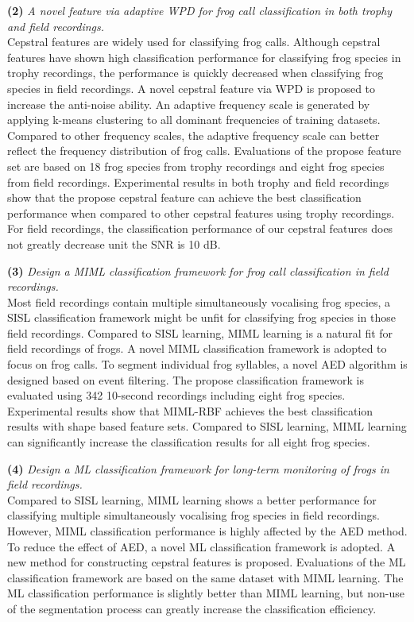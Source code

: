 \textbf{(2)} \textit{A novel feature via adaptive WPD for frog call classification in both trophy and field recordings.}
\\
Cepstral features are widely used for classifying frog calls. Although cepstral features have shown high classification performance for classifying frog species in trophy recordings, the performance is quickly decreased when classifying frog species in field recordings. A novel cepstral feature via WPD is proposed to increase the anti-noise ability. An adaptive frequency scale is generated by applying k-means clustering to all dominant frequencies of training datasets. Compared to other frequency scales, the adaptive frequency scale can better reflect the frequency distribution of frog calls. Evaluations of the propose feature set are based on 18 frog species from trophy recordings and eight frog species from field recordings. Experimental results in both trophy and field recordings show that the propose cepstral feature can achieve the best classification performance when compared to other cepstral features using trophy recordings. For field recordings, the classification performance of our cepstral features does not greatly decrease unit the SNR is 10 dB.



\textbf{(3)}  \textit{Design a MIML classification framework for frog call classification in field recordings.} 
\\
Most field recordings contain multiple simultaneously vocalising frog species, a SISL classification framework might be unfit for classifying frog species in those field recordings. Compared to SISL learning, MIML learning is a natural fit for field recordings of frogs. A novel MIML classification framework is adopted to focus on frog calls. To segment individual frog syllables, a novel AED algorithm is designed based on event filtering. The propose classification framework is evaluated using 342 10-second recordings including eight frog species. Experimental results show that MIML-RBF achieves the best classification results with shape based feature sets. Compared to SISL learning, MIML learning can significantly increase the classification results for all eight frog species.

\textbf{(4)}  \textit{Design a ML classification framework for long-term monitoring of frogs in field recordings.} 
\\ 
Compared to SISL learning, MIML learning shows a better performance for classifying multiple simultaneously vocalising frog species in field recordings.
However, MIML classification performance is highly affected by the AED method.
To reduce the effect of AED, a novel ML classification framework is adopted.
A new method for constructing cepstral features is proposed. Evaluations of the ML classification framework are based on the same dataset with MIML learning. The ML classification performance is slightly better than MIML learning, but non-use of the segmentation process can greatly increase the classification efficiency.


